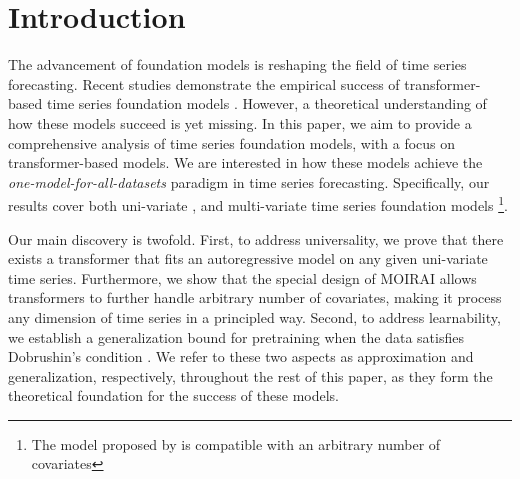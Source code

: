 \section{Introduction}

The advancement of foundation models is reshaping the field of time series forecasting.
Recent studies demonstrate the empirical success of transformer-based time series foundation models \cite{woo2024unified, ansari2024chronos, liang2024foundation, das2023decoder}.
However, a theoretical understanding of how these models succeed is yet missing.
In this paper, we aim to provide a comprehensive analysis of time series foundation models, with a focus on transformer-based models.
We are interested in how these models achieve the \emph{one-model-for-all-datasets} paradigm in time series forecasting.
Specifically, our results cover both uni-variate \cite{ansari2024chronos, das2023decoder, rasul2023lag}, and multi-variate time series foundation models \cite{woo2024unified}\footnote{The model proposed by \cite{woo2024unified} is compatible with an arbitrary number of covariates}.


Our main discovery is twofold.
First, to address universality, we prove that there exists a transformer that fits an autoregressive model \cite{hamilton2020time, mills1990time} on any given uni-variate time series.
Furthermore, we show that the special design of MOIRAI allows transformers to further handle arbitrary number of covariates, making it process any dimension of time series in a principled way.
Second, to address learnability, we establish a generalization bound for pretraining when the data satisfies Dobrushin's condition \cite{Dobrushin1968TheDO, dobrushin1987completely}.
We refer to these two aspects as approximation and generalization, respectively, throughout the rest of this paper, as they form the theoretical foundation for the success of these models.

